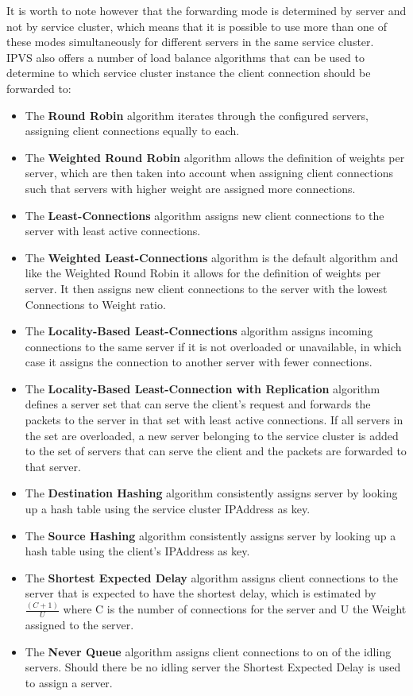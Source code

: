 It is worth to note however that the forwarding mode is determined by server and not by service cluster, which means that it is possible to use more than one of these modes simultaneously for different servers in the same service cluster.\\
%
IPVS also offers a number of load balance algorithms that can be used to determine to which service cluster instance the client connection should be forwarded to:
%
\begin{itemize}
	\item The \textbf{Round Robin} algorithm iterates through the configured servers, assigning client connections equally to each.
	\item The \textbf{Weighted Round Robin} algorithm allows the definition of weights per server, which are then taken into account when assigning client connections such that servers with higher weight are assigned more connections.
	\item The \textbf{Least-Connections} algorithm assigns new client connections to the server with least active connections.
	\item The \textbf{Weighted Least-Connections} algorithm is the default algorithm and like the Weighted Round Robin it allows for the definition of weights per server. It then assigns new client connections to the server with the lowest Connections to Weight ratio.
	\item The \textbf{Locality-Based Least-Connections} algorithm assigns incoming connections to the same server if it is not overloaded or unavailable, in which case it assigns the connection to another server with fewer connections.
	\item The \textbf{Locality-Based Least-Connection with Replication} algorithm defines a server set that can serve the client's request and forwards the packets to the server in that set with least active connections. If all servers in the set are overloaded, a new server belonging to the service cluster is added to the set of servers that can serve the client and the packets are forwarded to that server.
	\item The \textbf{Destination Hashing} algorithm consistently assigns server by looking up a hash table using the service cluster \gls{IPAddress} as key.
	\item The \textbf{Source Hashing} algorithm consistently assigns server by looking up a hash table using the client's \gls{IPAddress} as key.
	\item The \textbf{Shortest Expected Delay} algorithm assigns client connections to the server that is expected to have the shortest delay, which is estimated by $\frac{(C + 1)}{U}$ where C is the number of connections for the server and U the Weight assigned to the server.
	\item The \textbf{Never Queue} algorithm assigns client connections to on of the idling servers. Should there be no idling server the Shortest Expected Delay is used to assign a server.
\end{itemize}
